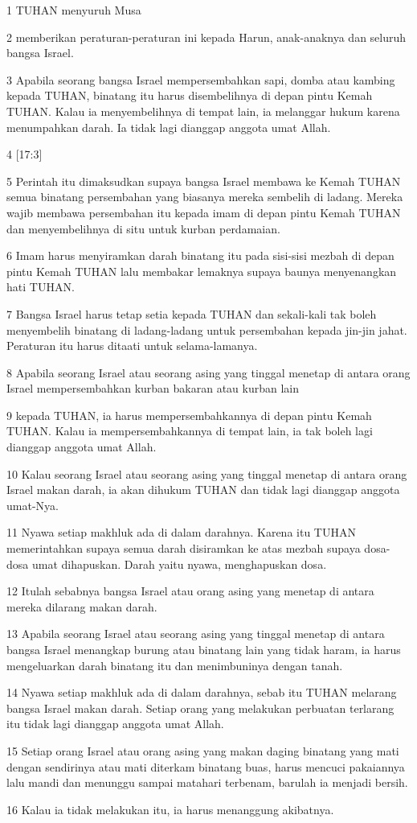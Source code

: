 \par 1 TUHAN menyuruh Musa
\par 2 memberikan peraturan-peraturan ini kepada Harun, anak-anaknya dan seluruh bangsa Israel.
\par 3 Apabila seorang bangsa Israel mempersembahkan sapi, domba atau kambing kepada TUHAN, binatang itu harus disembelihnya di depan pintu Kemah TUHAN. Kalau ia menyembelihnya di tempat lain, ia melanggar hukum karena menumpahkan darah. Ia tidak lagi dianggap anggota umat Allah.
\par 4 [17:3]
\par 5 Perintah itu dimaksudkan supaya bangsa Israel membawa ke Kemah TUHAN semua binatang persembahan yang biasanya mereka sembelih di ladang. Mereka wajib membawa persembahan itu kepada imam di depan pintu Kemah TUHAN dan menyembelihnya di situ untuk kurban perdamaian.
\par 6 Imam harus menyiramkan darah binatang itu pada sisi-sisi mezbah di depan pintu Kemah TUHAN lalu membakar lemaknya supaya baunya menyenangkan hati TUHAN.
\par 7 Bangsa Israel harus tetap setia kepada TUHAN dan sekali-kali tak boleh menyembelih binatang di ladang-ladang untuk persembahan kepada jin-jin jahat. Peraturan itu harus ditaati untuk selama-lamanya.
\par 8 Apabila seorang Israel atau seorang asing yang tinggal menetap di antara orang Israel mempersembahkan kurban bakaran atau kurban lain
\par 9 kepada TUHAN, ia harus mempersembahkannya di depan pintu Kemah TUHAN. Kalau ia mempersembahkannya di tempat lain, ia tak boleh lagi dianggap anggota umat Allah.
\par 10 Kalau seorang Israel atau seorang asing yang tinggal menetap di antara orang Israel makan darah, ia akan dihukum TUHAN dan tidak lagi dianggap anggota umat-Nya.
\par 11 Nyawa setiap makhluk ada di dalam darahnya. Karena itu TUHAN memerintahkan supaya semua darah disiramkan ke atas mezbah supaya dosa-dosa umat dihapuskan. Darah yaitu nyawa, menghapuskan dosa.
\par 12 Itulah sebabnya bangsa Israel atau orang asing yang menetap di antara mereka dilarang makan darah.
\par 13 Apabila seorang Israel atau seorang asing yang tinggal menetap di antara bangsa Israel menangkap burung atau binatang lain yang tidak haram, ia harus mengeluarkan darah binatang itu dan menimbuninya dengan tanah.
\par 14 Nyawa setiap makhluk ada di dalam darahnya, sebab itu TUHAN melarang bangsa Israel makan darah. Setiap orang yang melakukan perbuatan terlarang itu tidak lagi dianggap anggota umat Allah.
\par 15 Setiap orang Israel atau orang asing yang makan daging binatang yang mati dengan sendirinya atau mati diterkam binatang buas, harus mencuci pakaiannya lalu mandi dan menunggu sampai matahari terbenam, barulah ia menjadi bersih.
\par 16 Kalau ia tidak melakukan itu, ia harus menanggung akibatnya.

